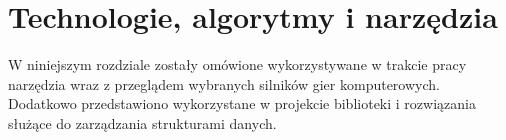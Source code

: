 \chapter{Technologie, algorytmy i narzędzia}
W niniejszym rozdziale zostały omówione wykorzystywane w trakcie pracy narzędzia wraz z przeglądem wybranych silników
gier komputerowych. Dodatkowo przedstawiono wykorzystane w projekcie biblioteki i rozwiązania służące do zarządzania strukturami danych.
